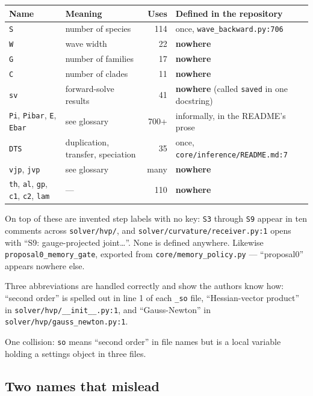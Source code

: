 \documentclass[11pt]{article}
\newcommand{\loc}[1]{\nolinkurl{#1}}
\newcommand{\dir}[1]{\nolinkurl{#1}}
\begin{document}
\begin{center}
\begin{tabular}{@{}p{}p{}rp{}@{}}
\toprule
Name & Meaning & Uses & Defined in the repository \\
\midrule
\texttt{S}  & number of species        & 114 & once, \loc{wave\_backward.py:706} \\
\texttt{W}  & wave width               &  22 & \textbf{nowhere} \\
\texttt{G}  & number of families       &  17 & \textbf{nowhere} \\
\texttt{C}  & number of clades         &  11 & \textbf{nowhere} \\
\texttt{sv} & forward-solve results    &  41 & \textbf{nowhere} (called \texttt{saved} in one docstring) \\
\texttt{Pi}, \texttt{Pibar}, \texttt{E}, \texttt{Ebar} & see glossary & 700+ & informally, in the README's prose \\
\texttt{DTS} & duplication, transfer, speciation & 35 & once, \loc{core/inference/README.md:7} \\
\texttt{vjp}, \texttt{jvp} & see glossary & many & \textbf{nowhere} \\
\texttt{th}, \texttt{al}, \texttt{gp}, \texttt{c1}, \texttt{c2}, \texttt{lam} & --- & 110 & \textbf{nowhere} \\
\bottomrule
\end{tabular}
\end{center}

On top of these are invented step labels with no key: \texttt{S3} through
\texttt{S9} appear in ten comments across \dir{solver/hvp/}, and
\loc{solver/curvature/receiver.py:1} opens with ``S9: gauge-projected
joint\ldots''.  None is defined anywhere.  Likewise
\texttt{proposal0\_memory\_gate}, exported from \dir{core/memory\_policy.py} ---
``proposal0'' appears nowhere else.

Three abbreviations are handled correctly and show the authors know how:
``second order'' is spelled out in line 1 of each \texttt{\_so} file,
``Hessian-vector product'' in \loc{solver/hvp/\_\_init\_\_.py:1}, and
``Gauss-Newton'' in \loc{solver/hvp/gauss\_newton.py:1}.

One collision: \texttt{so} means ``second order'' in file names but is a local
variable holding a settings object in three files.

\subsection{Two names that mislead}
\end{document}
